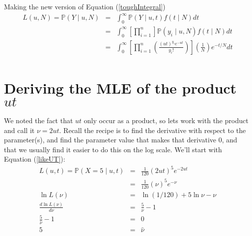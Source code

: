 \documentclass[11pt]{article}
\renewcommand{\Pr}{\mathbb{P}}
\begin{document}
Making the new version of Equation (\ref{toughIntegral})
\begin{eqnarray}
L(u, N)  = \Pr(Y \mid u, N)  & = &  \int_{0}^{\infty} \Pr(Y \mid u, t) f(t\mid N) dt \\
& = &  \int_{0}^{\infty} \left[ \prod_{i=1}^{n} \right] \Pr(y_i \mid u, N) f(t\mid N)  dt\\
& = &  \int_{0}^{\infty} \left[ \prod_{i=1}^{n}\left(\frac{(ut)^{y_i} e^{-ut}}{y_i!} \right)\right] \left(\frac{1}{N}\right) e^{-t/N}dt \\
\end{eqnarray}



\appendix
\section{Deriving the MLE of the product $ut$}\label{appUT}
We noted the fact that $ut$ only occur as a product, so
lets work with the product and call it $\nu=2ut$.
Recall the recipe is to find the derivative with respect to the parameter(s),
and find the parameter value that makes that derivative 0, and 
that we usually find it easier to do this on the log scale.
We'll start with Equation (\ref{likeUT}):
\begin{eqnarray*}
L(u, t) = \Pr(X=5 \mid u, t) & = &\frac{1}{120}(2ut)^5 e^{-2ut} \\
& = &\frac{1}{120}(\nu)^5 e^{-\nu} \\
\ln L(\nu) & = & \ln{(1/120)} + 5\ln\nu - \nu\\
\frac{d \ln L(\nu)}{d \nu} & = & \frac{5}{\nu} - 1 \\
\frac{5}{\hat{\nu}} - 1 & = & 0 \\
5 & = & \hat{\nu} 
\end{eqnarray*}
\end{document}

